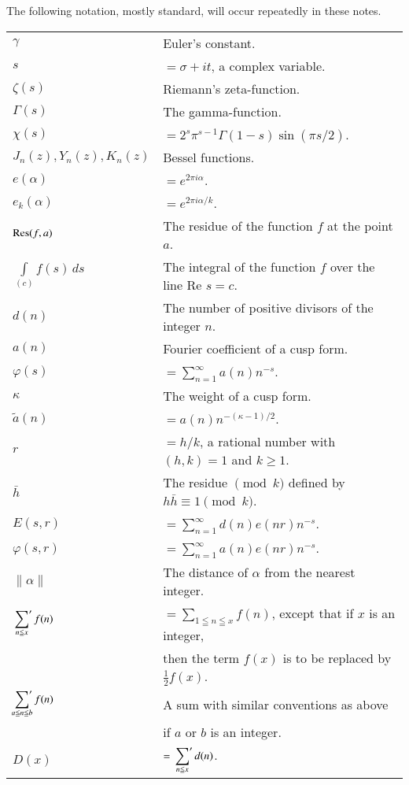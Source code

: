 The following notation, mostly standard, will occur repeatedly in these notes.
{\fontsize{9}{11}\selectfont
\tabcolsep=3pt
\begin{longtable}{ll}
$\gamma$ & Euler's constant.\\
$s$ & $=\sigma +it$, a complex variable.\\
$\zeta(s)$ & Riemann's zeta-function.\\
$\Gamma(s)$ & The gamma-function.\\
$\chi(s)$ & $=2^s\pi^{s-1}\Gamma(1-s)\sin(\pi s/2)$.\\
$J_n(z), Y_n(z), K_n(z)$ & Bessel functions.\\
$e(\alpha)$ & $=e^{2\pi i\alpha}$.\\
$e_k(\alpha)$ & $=e^{2\pi i\alpha/k}$.\\
$\operatorname{Res}(f,a)$ & The residue of the function $f$ at the point $a$.\\
$\int\limits_{(c)}f(s)\,ds$ & The integral of the function $f$ over the line Re $s=c$.\\
$d(n)$ & The number of positive divisors of the integer $n$.\\
$a(n)$ & Fourier coefficient of a cusp form.\\
$\varphi(s)$ & $=\sum\limits_{n=1}^\infty a(n)n^{-s}$.\\
$\kappa$ & The weight of a cusp form.\\
$\tilde{a}(n)$ & $=a(n)n^{-(\kappa-1)/2}$.\\
$r$ & $=h/k$, a rational number with $(h,k)=1$ and $k\geq 1$.\\
$\bar{h}$ & The residue $\pmod k$ defined by $h\bar{h}\equiv 1\pmod k$.\\
$E(s,r)$ & $=\sum\limits_{n=1}^\infty d(n)e(nr)n^{-s}$.\\
$\varphi(s,r)$ & $=\sum\limits_{n=1}^\infty a(n)e(nr)n^{-s}$.\\
$\parallel\alpha\parallel$ & The distance of $\alpha$ from the nearest integer.\\
$\sideset{}{'}\sum\limits_{n\leqq x}f(n)$ & $=\sum\limits_{1\leqq n\leqq x}f(n)$, except that if $x$ is an integer,\\
&  then the term $f(x)$ is to be replaced by $\frac{1}{2}f(x)$.\\
$\sideset{}{'}\sum\limits_{a\leqq n\leqq b}f(n)$ & A sum with similar conventions as above\\
& if $a$ or $b$ is an integer.\\
$D(x)$ & $=\sideset{}{'}\sum\limits_{n\leqq x}d(n)$.\\

\end{longtable}}
